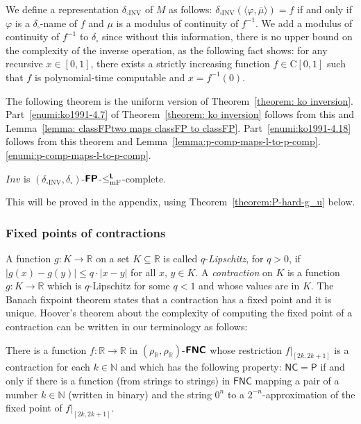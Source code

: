 \documentclass[envcountsect,envcountsame,orivec,oribibl]{llncs}
\newcommand{\R}{\mathbb R}
\newcommand{\N}{\mathbb N}
\newcommand{\classonefont}[1]{\mathsf{#1}}
\newcommand{\classP}{\classonefont{P}}
\newcommand{\classNC}{\classonefont{NC}}
\newcommand{\classFNC}{\classonefont{FNC}}
\newcommand{\classtwofont}[1]{\text{\bfseries \sffamily \upshape #1}}
\newcommand{\classLtwo}{\classtwofont{L}}
\newcommand{\classFNCtwo}{\classtwofont{FNC}}
\newcommand{\classFPtwo}{\classtwofont{FP}}
\newcommand{\deltabox}{\delta _\square}
\newcommand{\deltaboxINV}{\delta _{\square \mathrm{INV}}}
\newcommand{\rhoR}{\rho _\R}
\newcommand{\redmF}{\leq _{\mathrm{mF}}}
\newcommand{\redLmF}{\redmF ^{\classLtwo}}
\newcommand{\classC}{\mathrm C}
\newcommand{\OpINV}{\mathit{Inv}}
\begin{document}
We define a representation $\deltaboxINV$ of $M$ as follows:
$\deltaboxINV(\langle \varphi, \overline{\mu} \rangle) = f$ 
if and only if $\varphi$ is a $\deltabox$-name of $f$ 
and $\mu$ is a modulus of continuity of $f^{-1}$.
We add a modulus of continuity of $f^{-1}$ to $\deltabox$
since without this information, there is no upper bound on 
the complexity of the inverse operation, 
as the following fact \cite[Theorem 4.4]{ko1991complexity} shows: 
for any recursive $x \in [0, 1]$, 
there exists a strictly increasing function $f \in \classC[0, 1]$ 
such that $f$ is polynomial-time computable and $x = f^{-1}(0)$.

The following theorem is the uniform version of Theorem~\ref{theorem: ko inversion}. 
Part~\ref{enumi:ko1991-4.7} of Theorem~\ref{theorem: ko inversion} 
follows from this and Lemma~\ref{lemma: classFPtwo maps classFP to classFP}.
Part~\ref{enumi:ko1991-4.18} follows from this theorem and Lemma~\ref{lemma:p-comp-maps-l-to-p-comp}.\ref{enumi:p-comp-maps-l-to-p-comp}.

\begin{theorem}
 \label{theorem:INV-is-P-complete}
 $\OpINV$ is $(\deltaboxINV, \deltabox)$-$\classFPtwo$-$\redLmF$-complete.
\end{theorem}

This will be proved in the appendix, 
using 
Theorem~\ref{theorem:P-hard-g_u} below. 

\subsubsection{Fixed points of contractions}

A function $g \colon K \to \R$ on a set $K \subseteq \R$
is called $q$-\emph{Lipschitz}, for $q > 0$, 
if $
\lvert g (x) - g (y) \rvert \leq q \cdot \lvert x - y \rvert
$ for all $x$, $y \in K$. 
A \emph{contraction} on $K$ is 
a function $g \colon K \to \R$ which is $q$-Lipschitz for some $q < 1$
and whose values are in $K$. 
The Banach fixpoint theorem states that 
a contraction has a fixed point and it is unique. 
Hoover's theorem about the complexity of computing the fixed point
of a contraction can be written in our terminology as follows:

\begin{theorem}
\label{theorem:hoover1991-4.5}
 There is a function $f \colon \R \to \R$ in $(\rhoR, \rhoR)$-$\classFNCtwo$
 whose restriction $f|_{[2k, 2k+1]}$ is a contraction for each $k \in \N$ and
 which has the following property: 
 $\classNC = \classP$ if and only if 
 there is a function (from strings to strings) in $\classFNC$ mapping 
 a pair of a number $k \in \N$ (written in binary) and the string $0^n$
 to a $2^{-n}$-approximation of the 
 fixed point of $f |_{[2k, 2k + 1]}$. 
\end{theorem}
\end{document}
